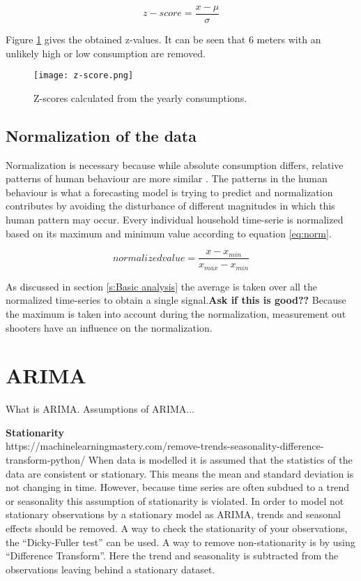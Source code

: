 \begin{equation}
	z-score = \frac{x-\mu}{\sigma}
\end{equation}                      

Figure \ref{fig:z-score} gives the obtained z-values. It can be seen that $ 6 $ meters with an unlikely high or low consumption are removed. 

\begin{figure}[h!]
	\centering
	\texttt{[image: z-score.png]}
	\caption{Z-scores calculated from the yearly consumptions.}
	\label{fig:z-score}
\end{figure}


\subsection{Normalization of the data}
Normalization is necessary because while absolute consumption differs, relative patterns of human behaviour are more similar \cite{Lago2020}. The patterns in the human behaviour is what a forecasting model is trying to predict and normalization contributes by avoiding the disturbance of different magnitudes in which this human pattern may occur. Every individual household time-serie is normalized based on its maximum and minimum value according to equation \ref{eq:norm}. 

\begin{equation}\label{eq:norm}
	normalized value = \frac{x - x_{min}}{x_{max} - x_{min}}
\end{equation}  

As discussed in section \ref{s:Basic analysis} the average is taken over all the normalized time-series to obtain a single signal.\textbf{Ask if this is good??}  Because the maximum is taken into account during the normalization, measurement out shooters have an influence on the normalization. 


\section{ARIMA}
What is ARIMA. 
Assumptions of ARIMA...

\textbf{Stationarity}\\
https://machinelearningmastery.com/remove-trends-seasonality-difference-transform-python/
When data is modelled it is assumed that the statistics of the data are consistent or stationary. This means the mean and standard deviation is not changing in time. However, because time series are often subdued to a trend or seasonality this assumption of stationarity is violated. In order to model not stationary observations by a stationary model as ARIMA, trends and seasonal effects should be removed. A way to check the stationarity of your observations, the ``Dicky-Fuller test'' can be used.
A way to remove non-stationarity is by using ``Difference Transform''. Here the trend and seasonality is subtracted from the observations leaving behind a stationary dataset.


